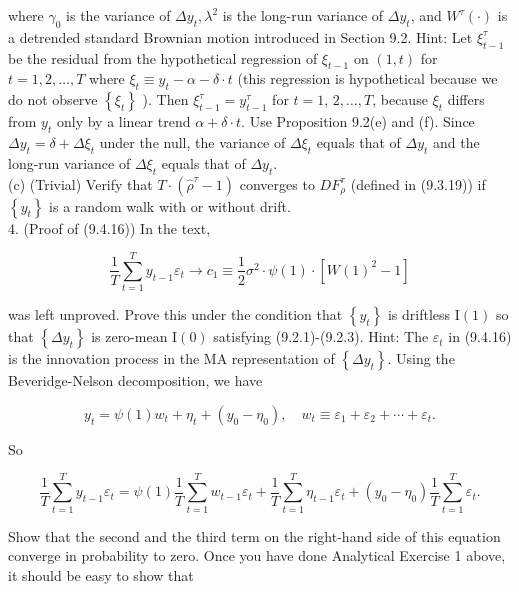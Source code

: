 \documentclass[10pt]{article}
\begin{document}
where $\gamma_{0}$ is the variance of $\Delta y_{t}, \lambda^{2}$ is the long-run variance of $\Delta y_{t}$, and $W^{\tau}(\cdot)$ is a detrended standard Brownian motion introduced in Section 9.2. Hint: Let $\xi_{t-1}^{\tau}$ be the residual from the hypothetical regression of $\xi_{t-1}$ on $(1, t)$ for $t=1,2, \ldots, T$ where $\xi_{t} \equiv y_{t}-\alpha-\delta \cdot t$ (this regression is hypothetical because we do not observe $\left\{\xi_{t}\right\}$ ). Then $\xi_{t-1}^{\tau}=y_{t-1}^{\tau}$ for $t=1$, $2, \ldots, T$, because $\xi_{t}$ differs from $y_{t}$ only by a linear trend $\alpha+\delta \cdot t$. Use Proposition 9.2(e) and (f). Since $\Delta y_{t}=\delta+\Delta \xi_{t}$ under the null, the variance of $\Delta \xi_{t}$ equals that of $\Delta y_{t}$ and the long-run variance of $\Delta \xi_{t}$ equals that of $\Delta y_{t}$.\\
(c) (Trivial) Verify that $T \cdot\left(\hat{\rho}^{\tau}-1\right)$ converges to $D F_{\rho}^{\tau}$ (defined in (9.3.19)) if $\left\{y_{t}\right\}$ is a random walk with or without drift.\\
4. (Proof of (9.4.16)) In the text,


\begin{equation*}
\frac{1}{T} \sum_{t=1}^{T} y_{t-1} \varepsilon_{t} \rightarrow c_{1} \equiv \frac{1}{2} \sigma^{2} \cdot \psi(1) \cdot\left[W(1)^{2}-1\right] \tag{9.4.16}
\end{equation*}


was left unproved. Prove this under the condition that $\left\{y_{t}\right\}$ is driftless $\mathrm{I}(1)$ so that $\left\{\Delta y_{t}\right\}$ is zero-mean $\mathrm{I}(0)$ satisfying (9.2.1)-(9.2.3). Hint: The $\varepsilon_{t}$ in (9.4.16) is the innovation process in the MA representation of $\left\{\Delta y_{t}\right\}$. Using the Beveridge-Nelson decomposition, we have

$$
y_{t}=\psi(1) w_{t}+\eta_{t}+\left(y_{0}-\eta_{0}\right), \quad w_{t} \equiv \varepsilon_{1}+\varepsilon_{2}+\cdots+\varepsilon_{t} .
$$

So


\begin{equation*}
\frac{1}{T} \sum_{t=1}^{T} y_{t-1} \varepsilon_{t}=\psi(1) \frac{1}{T} \sum_{t=1}^{T} w_{t-1} \varepsilon_{t}+\frac{1}{T} \sum_{t=1}^{T} \eta_{t-1} \varepsilon_{t}+\left(y_{0}-\eta_{0}\right) \frac{1}{T} \sum_{t=1}^{T} \varepsilon_{t} . \tag{*}
\end{equation*}


Show that the second and the third term on the right-hand side of this equation converge in probability to zero. Once you have done Analytical Exercise 1 above, it should be easy to show that
\end{document}
